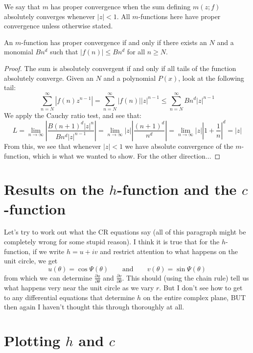 \documentclass[a4paper]{amsart}
\begin{document}
\begin{definition}
  We say that $m$ has proper convergence when the sum defining $m(z; f)$ absolutely converges whenever $|z| < 1$. All $m$-functions here have proper convergence unless otherwise stated.
\end{definition}

\begin{proposition}
  An $m$-function has proper convergence if and only if there exists an $N$ and a monomial $Bn^d$ such that $|f(n)| \le Bn^d$ for all $n \ge N$.
\end{proposition}

\begin{proof}
  The sum is absolutely convergent if and only if all tails of the function absolutely converge. Given an $N$ and a polynomial $P(x)$, look at the following tail:
  $$\sum_{n = N}^{\infty} |f(n)z^{n - 1}| = \sum_{n = N}^{\infty} |f(n)| |z|^{n - 1} \le \sum_{n = N}^{\infty} Bn^d |z|^{n - 1}$$
  We apply the Cauchy ratio test, and see that:
  $$L = \lim_{n \to \infty} \left|\frac{B(n + 1)^d |z|^{n}}{Bn^d |z|^{n - 1}}\right| = \lim_{n \to \infty} |z|\left|\frac{(n + 1)^d}{n^d}\right| = \lim_{n \to \infty} |z|\left|1 + \frac{ 1}{n}\right|^d = |z|$$
  From this, we see that whenever $|z| < 1$ we have absolute convergence of the $m$-function, which is what we wanted to show. For the other direction... 

\end{proof}

\section{Results on the $h$-function and the $c$-function}

Let's try to work out what the CR equations say (all of this paragraph might be completely wrong for some stupid reason). I think it is true that for the $h$-function, if we write $h = u+ iv$ and restrict attention to what happens on the unit circle, we get
$$ u(\theta) = \cos \Psi(\theta) \quad \quad \textrm{and} \quad \quad v(\theta) =  \sin \Psi(\theta) $$
from which we can determine $\frac{\partial u}{\partial \theta}$ and $\frac{\partial v}{\partial \theta}$. This should (using the chain rule) tell us what happens very near the unit circle as we vary $r$. But I don't see how to get to any differential equations that determine $h$ on the entire complex plane, BUT then again I haven't thought this through thoroughly at all.

\section{Plotting $h$ and $c$}
\end{document}
